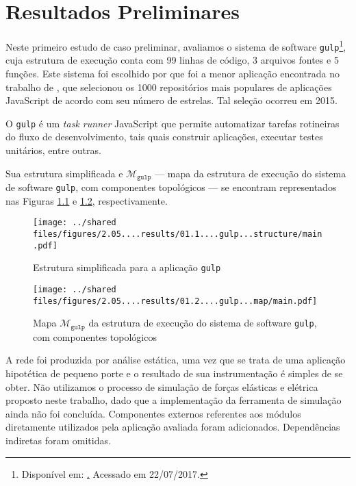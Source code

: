 
%

\chapter{Resultados Preliminares}
\label{Chapter:Results}

Neste primeiro estudo de caso preliminar, avaliamos o sistema de software
\texttt{gulp}\footnote{Disponível em: \href{http://gulpjs.com}. Acessado em 22/07/2017.},
cuja estrutura de execução conta com 99 linhas de código, 3 arquivos fontes e 5
funções.
Este sistema foi escolhido por que foi a menor aplicação encontrada no trabalho
de , que selecionou os 1000 repositórios mais
populares de aplicações JavaScript de acordo com seu número de estrelas.
Tal seleção ocorreu em 2015.

O \texttt{gulp} é um \textit{task runner} JavaScript que permite automatizar tarefas
rotineiras do fluxo de desenvolvimento, tais quais construir aplicações,
executar testes unitários, entre outras.

Sua estrutura simplificada e $\mathcal{M}_{\texttt{gulp}}$
--- mapa da estrutura de execução do sistema de software \texttt{gulp}, com componentes
topológicos --- se encontram representados nas Figuras
\ref{Figure:GulpStructure} e \ref{Figure:GulpMap}, respectivamente.

\begin{figure}[!htb]
    \centering
    \caption{Estrutura simplificada para a aplicação \texttt{gulp}}
    \texttt{[image: ../shared files/figures/2.05....results/01.1....gulp...structure/main.pdf]}
    \label{Figure:GulpStructure}
\end{figure}

\begin{figure}[!htb]
    \centering
    \caption{Mapa $\mathcal{M}_{\texttt{gulp}}$ da estrutura de execução do sistema de software \texttt{gulp}, com componentes topológicos}
    \texttt{[image: ../shared files/figures/2.05....results/01.2....gulp...map/main.pdf]}
    \label{Figure:GulpMap}
\end{figure}

A rede foi produzida por análise estática, uma vez que se trata de uma aplicação
hipotética de pequeno porte e o resultado de sua instrumentação é simples de se
obter.
Não utilizamos o processo de simulação de forças elásticas e elétrica proposto
neste trabalho, dado que a implementação da ferramenta de simulação ainda não
foi concluída.
Componentes externos referentes aos módulos diretamente utilizados pela
aplicação avaliada foram adicionados. Dependências indiretas foram omitidas.

